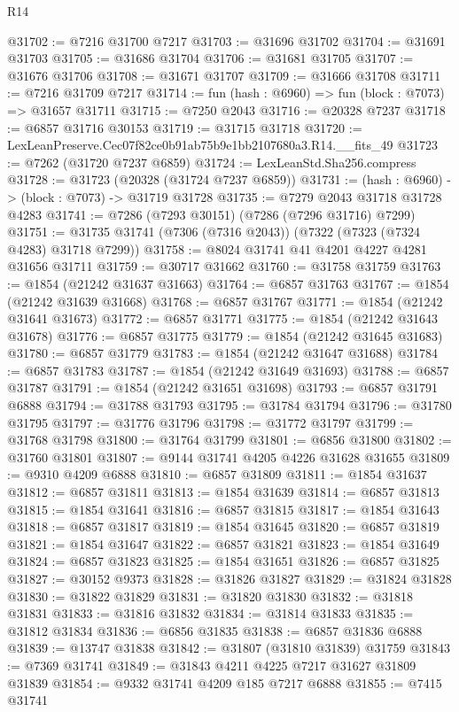 \begin{lexlean}{R14}
\begin{coremodule}
@31702 := @7216 @31700 @7217
@31703 := @31696 @31702
@31704 := @31691 @31703
@31705 := @31686 @31704
@31706 := @31681 @31705
@31707 := @31676 @31706
@31708 := @31671 @31707
@31709 := @31666 @31708
@31711 := @7216 @31709 @7217
@31714 := fun (hash : @6960) => fun (block : @7073) => @31657 @31711
@31715 := @7250 @2043
@31716 := @20328 @7237
@31718 := @6857 @31716 @30153
@31719 := @31715 @31718
@31720 := LexLeanPreserve.Cec07f82ce0b91ab75b9e1bb2107680a3.R14.__fits_49
@31723 := @7262 (@31720 @7237 @6859)
@31724 := LexLeanStd.Sha256.compress
@31728 := @31723 (@20328 (@31724 @7237 @6859))
@31731 := (hash : @6960) -> (block : @7073) -> @31719 @31728
@31735 := @7279 @2043 @31718 @31728 @4283
@31741 := @7286 (@7293 @30151) (@7286 (@7296 @31716) @7299)
@31751 := @31735 @31741 (@7306 (@7316 @2043)) (@7322 (@7323 (@7324 @4283) @31718 @7299))
@31758 := @8024 @31741 @41 @4201 @4227 @4281 @31656 @31711
@31759 := @30717 @31662
@31760 := @31758 @31759
@31763 := @1854 (@21242 @31637 @31663)
@31764 := @6857 @31763
@31767 := @1854 (@21242 @31639 @31668)
@31768 := @6857 @31767
@31771 := @1854 (@21242 @31641 @31673)
@31772 := @6857 @31771
@31775 := @1854 (@21242 @31643 @31678)
@31776 := @6857 @31775
@31779 := @1854 (@21242 @31645 @31683)
@31780 := @6857 @31779
@31783 := @1854 (@21242 @31647 @31688)
@31784 := @6857 @31783
@31787 := @1854 (@21242 @31649 @31693)
@31788 := @6857 @31787
@31791 := @1854 (@21242 @31651 @31698)
@31793 := @6857 @31791 @6888
@31794 := @31788 @31793
@31795 := @31784 @31794
@31796 := @31780 @31795
@31797 := @31776 @31796
@31798 := @31772 @31797
@31799 := @31768 @31798
@31800 := @31764 @31799
@31801 := @6856 @31800
@31802 := @31760 @31801
@31807 := @9144 @31741 @4205 @4226 @31628 @31655
@31809 := @9310 @4209 @6888
@31810 := @6857 @31809
@31811 := @1854 @31637
@31812 := @6857 @31811
@31813 := @1854 @31639
@31814 := @6857 @31813
@31815 := @1854 @31641
@31816 := @6857 @31815
@31817 := @1854 @31643
@31818 := @6857 @31817
@31819 := @1854 @31645
@31820 := @6857 @31819
@31821 := @1854 @31647
@31822 := @6857 @31821
@31823 := @1854 @31649
@31824 := @6857 @31823
@31825 := @1854 @31651
@31826 := @6857 @31825
@31827 := @30152 @9373
@31828 := @31826 @31827
@31829 := @31824 @31828
@31830 := @31822 @31829
@31831 := @31820 @31830
@31832 := @31818 @31831
@31833 := @31816 @31832
@31834 := @31814 @31833
@31835 := @31812 @31834
@31836 := @6856 @31835
@31838 := @6857 @31836 @6888
@31839 := @13747 @31838
@31842 := @31807 (@31810 @31839) @31759
@31843 := @7369 @31741
@31849 := @31843 @4211 @4225 @7217 @31627 @31809 @31839
@31854 := @9332 @31741 @4209 @185 @7217 @6888
@31855 := @7415 @31741

\end{coremodule}
\end{lexlean}

